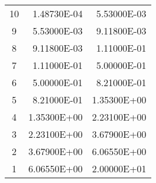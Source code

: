 \begin{appendices}
\begin{table}[h!]
\begin{tabular}{c r r}
10 & 1.48730E-04 & 5.53000E-03 \\
9 & 5.53000E-03 & 9.11800E-03 \\
8 & 9.11800E-03 & 1.11000E-01 \\
7 & 1.11000E-01 & 5.00000E-01 \\
6 & 5.00000E-01 & 8.21000E-01 \\
5 & 8.21000E-01 & 1.35300E+00 \\
4 & 1.35300E+00 & 2.23100E+00 \\
3 & 2.23100E+00 & 3.67900E+00 \\
2 & 3.67900E+00 & 6.06550E+00 \\
1 & 6.06550E+00 & 2.00000E+01 \\
  \bottomrule
 \end{tabular}
\end{table}



\end{appendices}
